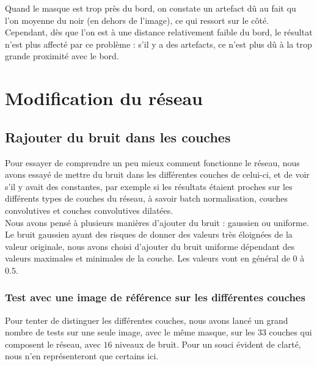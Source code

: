 \documentclass[12pt]{article}
\begin{document}
Quand le masque est trop près du bord, on constate un artefact dû au fait qu l'on moyenne du noir (en dehors de l'image), ce qui ressort sur le côté. Cependant, dès que l'on est à une distance relativement faible du bord, le résultat n'est plus affecté par ce problème : s'il y a des artefacts, ce n'est plus dû à la trop grande proximité avec le bord.

\section{Modification du réseau}

\subsection{Rajouter du bruit dans les couches}
Pour essayer de comprendre un peu mieux comment fonctionne le réseau, nous avons essayé de mettre du bruit dans les différentes couches de celui-ci, et de voir s'il y avait des constantes, par exemple si les résultats étaient proches sur les différents types de couches du réseau, à savoir batch normalisation, couches convolutives et couches convolutives dilatées.\\
Nous avons pensé à plusieurs manières d'ajouter du bruit : gaussien ou uniforme. Le bruit gaussien ayant des risques de donner des valeurs très éloignées de la valeur originale, nous avons choisi d'ajouter du bruit uniforme dépendant des valeurs maximales et minimales de la couche. Les valeurs vont en général de $0$ à $0.5$.\\

\subsubsection{Test avec une image de référence sur les différentes couches}
Pour tenter de distinguer les différentes couches, nous avons lancé un grand nombre de tests sur une seule image, avec le même masque, sur les 33 couches qui composent le réseau, avec $16$ niveaux de bruit. Pour un souci évident de clarté, nous n'en représenteront que certains ici.
\end{document}
